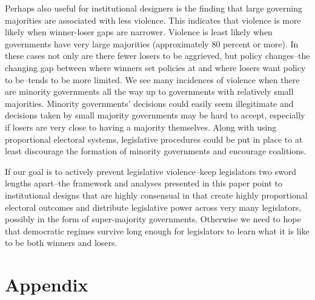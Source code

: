 \documentclass[a4paper]{article}\usepackage{graphicx, color}
\begin{document}
Perhaps also useful for institutional designers is the finding that large governing majorities are associated with less violence. This indicates that violence is more likely when winner-loser gaps are narrower. Violence is least likely when governments have very large majorities (approximately 80 percent or more). In these cases not only are there fewer losers to be aggrieved, but policy changes--the changing gap between where winners set policies at and where losers want policy to be--tends to be more limited. We see many incidences of violence when there are minority governments all the way up to governments with relatively small majorities. Minority governments' decisions could easily seem illegitimate and decisions taken by small majority governments may be hard to accept, especially if losers are very close to having a majority themselves. Along with using proportional electoral systems, legislative procedures could be put in place to at least discourage the formation of minority governments and encourage coalitions. %

If our goal is to actively prevent legislative violence--keep legislators two sword lengths apart--the framework and analyses presented in this paper point to institutional designs that are highly consensual in that create highly proportional electoral outcomes and distribute legislative power across very many legislators, possibly in the form of super-majority governments. Otherwise we need to hope that democratic regimes survive long enough for legislators to learn what it is like to be both winners and losers.





\theendnotes


\clearpage
\section*{Appendix}
\end{document}
